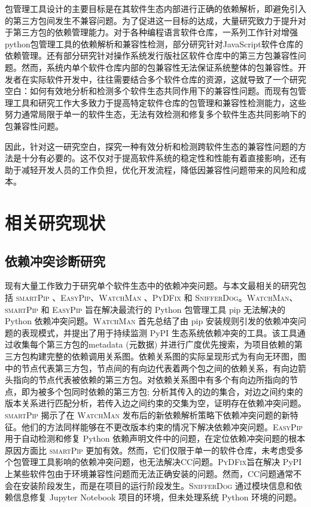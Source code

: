 包管理工具设计的主要目标是在其软件生态内部进行正确的依赖解析，即避免引入的第三方包间发生不兼容问题。为了促进这一目标的达成，大量研究致力于提升对于第三方包的依赖管理能力。对于各种编程语言软件仓库，一系列工作针对增强python包管理工具的依赖解析和兼容性检测，部分研究针对JavaScript软件仓库的依赖管理。还有部分研究针对操作系统发行版社区软件仓库中的第三方包兼容性问题。然而，系统内单个软件仓库内部的包兼容性无法保证系统整体的包兼容性。开发者在实际软件开发中，往往需要结合多个软件仓库的资源，这就导致了一个研究空白：如何有效地分析和检测多个软件生态共同作用下的兼容性问题。而现有包管理工具和研究工作大多致力于提高特定软件仓库的包管理和兼容性检测能力，这些努力通常局限于单一的软件生态，无法有效检测和修复多个软件生态共同影响下的包兼容性问题。

因此，针对这一研究空白，探究一种有效分析和检测跨软件生态的兼容性问题的方法是十分有必要的。这不仅对于提高软件系统的稳定性和性能有着直接影响，还有助于减轻开发人员的工作负担，优化开发流程，降低因兼容性问题带来的风险和成本。


\section{相关研究现状}
\subsection{依赖冲突诊断研究}
现有大量工作致力于研究单个软件生态中的依赖冲突问题。与本文最相关的研究包括 \textsc{smartPip} 、\textsc{EasyPip}、\textsc{WatchMan} 、\textsc{PyDFix} 和 \textsc{SnifferDog}。\textsc{WatchMan}、\textsc{smartPip} 和 \textsc{EasyPip} 旨在解决最流行的 Python 包管理工具 pip 无法解决的 Python 依赖冲突问题。\textsc{WatchMan} 首先总结了由 pip 安装规则引发的依赖冲突问题的表现模式，并提出了用于持续监测 PyPI 生态系统依赖冲突的工具。该工具通过收集每个第三方包的metadata (元数据) 并进行广度优先搜索，为项目依赖的第三方包构建完整的依赖调用关系图。依赖关系图的实际呈现形式为有向无环图，图中的节点代表第三方包，节点间的有向边代表着两个包之间的依赖关系，有向边箭头指向的节点代表被依赖的第三方包。对依赖关系图中有多个有向边所指向的节点，即为被多个包同时依赖的第三方包; 分析其传入的边的集合，对边之间约束的版本关系进行匹配分析，若传入边之间约束的交集为空，证明存在依赖冲突问题。\textsc{smartPip} 揭示了在 \textsc{WatchMan} 发布后的新依赖解析策略下依赖冲突问题的新特征。他们的方法同样能够在不更改版本约束的情况下解决依赖冲突问题。\textsc{EasyPip} 用于自动检测和修复 Python 依赖声明文件中的问题，在定位依赖冲突问题的根本原因方面比 \textsc{smartPip} 更加有效。然而，它们仅限于单一的软件仓库，未考虑受多个包管理工具影响的依赖冲突问题，也无法解决CC问题。\textsc{PyDFix}旨在解决 PyPI 上某些软件包由于环境兼容性问题而无法正确安装的问题。然而，CC问题通常不会在安装阶段发生，而是在项目的运行阶段发生。\textsc{SnifferDog} 通过模块信息和依赖信息修复 Jupyter Notebook 项目的环境，但未处理系统 Python 环境的问题。

